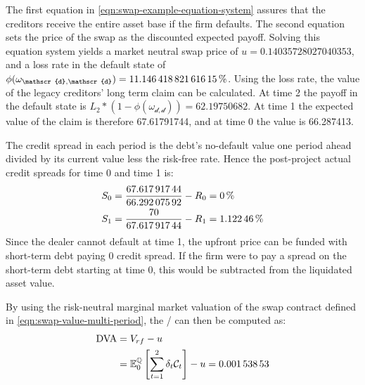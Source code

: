 \documentclass[main.tex]{subfiles}
\begin{document}
            The first equation in \cref{eqn:swap-example-equation-system} assures that the creditors receive the entire asset base if the firm defaults.
            The second equation sets the price of the swap as the discounted expected payoff.
            Solving this equation system yields a market neutral swap price of $u=\num{0.14035728027040353}$,
            and a loss rate in the default state of 
            $\phi(\omega_{\mathscr{d},\mathscr{d}})=\pct{0.11146418821616146}$.
            Using the loss rate, the value of the legacy creditors' long term claim can be calculated.
            At time 2 the payoff in the default state is 
            $L_{2}*(1-\phi(\omega_{\mathscr{d},\mathscr{d}})) = \num{62.19750682}$.
            At time 1 the expected value of the claim is therefore \num{67.61791744},
            and at time 0 the value is \num{66.287413}.

            The credit spread in each period is the debt's no-default value one period ahead
            divided by its current value less the risk-free rate.
            Hence the post-project actual credit spreads for time 0 and time 1 is:
            \begin{align}
                S_{0} 
                &=
                \frac{
                    \num{67.61791744}
                }{
                    \num{66.29207592}
                }
                -
                R_{0}
                =
                \pct{0}
                \\
                S_{1} 
                &= 
                \frac{
                    \num{70}
                }{
                    \num{67.61791744}
                } 
                -
                R_{1}
                =
                \pct{0.0112246}
            \end{align}
            Since the dealer cannot default at time 1,
            the upfront price can be funded with short-term debt paying 0 credit spread.
            If the firm were to pay a spread on the short-term debt starting at time 0,
            this would be subtracted from the liquidated asset value. 

            By using the risk-neutral marginal market valuation of the swap contract
            defined in \cref{eqn:swap-value-multi-period},
            the \DVA/ can then be computed as:
            \begin{align}
                \DVA/ &= V_{rf} - u
                \nonumber
                \\
                &= \mathbb{E}_{0}^{\rnmeasure}\left[\sum_{t=1}^{2}\delta_t \mathcal{C}_t\right] - u
                = \num{0.00153853}
            \end{align}
\end{document}
